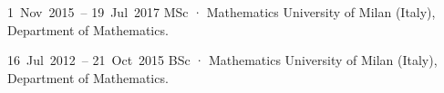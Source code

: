 
\chronorow
  {1~Nov~2015~--\allowbreak{} 19~Jul~2017}
  {MSc · Mathematics}
  {\textcolor{secondary}{University of Milan (Italy), Department of Mathematics.}}

\chronorow
  {16~Jul~2012~--\allowbreak{} 21~Oct~2015}
  {BSc · Mathematics}
  {\textcolor{secondary}{University of Milan (Italy), Department of Mathematics.}}
